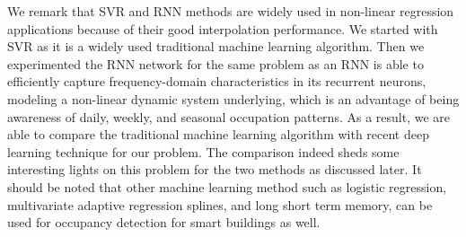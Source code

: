 \textcolor{feb18rev}{We
  remark that SVR and RNN methods are widely used in non-linear
  regression applications because of their good interpolation
  performance.  We started with SVR as it is a widely used traditional
  machine learning algorithm. Then we experimented the RNN network for the
  same problem as an RNN is able to efficiently capture
  frequency-domain characteristics in its recurrent neurons, modeling
  a non-linear dynamic system underlying, which is an advantage of
  being awareness of daily, weekly, and seasonal occupation patterns.
  As a result, we are able to compare the traditional machine learning
  algorithm with recent deep learning technique for our problem. The
  comparison indeed sheds some interesting lights on this problem for
  the two methods as discussed later.  It should be noted that
  other machine learning method such as logistic regression, multivariate
  adaptive regression splines, and long short term memory, can be used for
  occupancy detection for smart buildings as well.}

